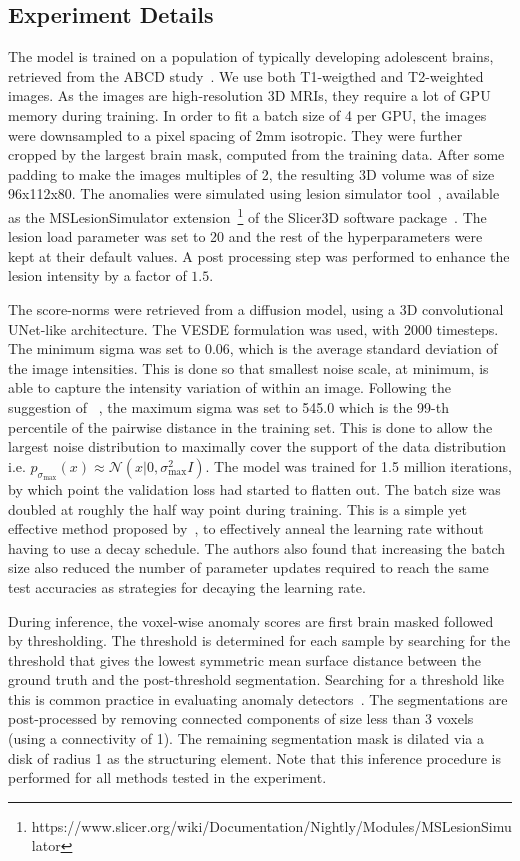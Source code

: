 \subsection*{Experiment Details}
The model is trained on a population of typically developing adolescent brains, retrieved from the ABCD study~\cite{Casey2018adolescent}. We use both T1-weigthed and T2-weighted images. As the images are high-resolution 3D MRIs, they require a lot of GPU memory during training. In order to fit a batch size of 4 per GPU, the images were downsampled to a pixel spacing of 2mm isotropic. They were further cropped by the largest brain mask, computed from the training data. After some padding to make the images multiples of 2, the resulting 3D volume was of size 96x112x80. The anomalies were simulated using lesion simulator tool~\cite{Filho_2019}, available as the MSLesionSimulator extension~\footnote{https://www.slicer.org/wiki/Documentation/Nightly/Modules/MSLesionSimulator} of the Slicer3D software package~\cite{fedorov3DSlicerImage2012}. The lesion load parameter was set to 20 and the rest of the hyperparameters were kept at their default values. A post processing step was performed to enhance the lesion intensity by a factor of $1.5$.

The score-norms were retrieved from a diffusion model, using a 3D convolutional UNet-like architecture. The VESDE formulation was used, with 2000 timesteps. The minimum sigma was set to 0.06, which is the average standard deviation of the image intensities. This is done so that smallest noise scale, at minimum, is able to capture the intensity variation of within an image. Following the suggestion of ~\cite{song2020score}, the maximum sigma was set to 545.0 which is the 99-th percentile of the pairwise distance in the training set. This is done to allow the largest noise distribution to maximally cover the support of the data distribution i.e. $p_{\sigma_\text{max}}(x) \approx \mathcal{N}(x| 0, \sigma_\text{max}^2I)$. The model was trained for 1.5 million iterations, by which point the validation loss had started to flatten out. The batch size was doubled at roughly the half way point during training. This is a simple yet effective method proposed by~\cite{le2018dont}, to effectively anneal the learning rate without having to use a decay schedule. The authors also found that increasing the batch size also reduced the number of parameter updates required to reach the same test accuracies as strategies for decaying the learning rate.

During inference, the voxel-wise anomaly scores are first brain masked followed by thresholding. The threshold is determined for each sample by searching for the threshold that gives the lowest symmetric mean surface distance between the ground truth and the post-threshold segmentation. Searching for a threshold like this is common practice in evaluating anomaly detectors~\cite{baur_deep_2019}. The segmentations are post-processed by removing connected components of size less than 3 voxels (using a connectivity of 1). The remaining segmentation mask is dilated via a disk of radius 1 as the structuring element. Note that this inference procedure is performed for all methods tested in the experiment.

